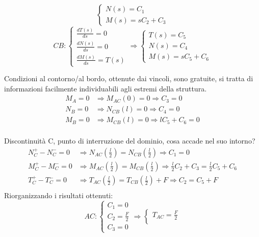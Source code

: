 \documentclass{article}
\begin{document}
\begin{adjustwidth}{2in}{}
\[\begin{cases}
		N(s) = C_1 \\
		
		M(s) =  sC_2 + C_3
	\end{cases}
	\] \newline
	\[
CB:	\begin{cases}
	\frac{dT(s)}{ds}= 0 \\
		
	\frac{dN(s)}{ds}  = 0 \\
		
	\frac{dM(s)}{ds} = T(s) 
	\end{cases} \Rightarrow \begin{cases}
	T(s) = C_5 \\
		
	N(s) = C_4 \\
		
	M(s) =  sC_5 + C_6
	\end{cases}
	\]
	
	Condizioni al contorno/al bordo, ottenute dai vincoli, sono gratuite, si tratta di informazioni facilmente individuabili agli estremi della struttura. \newline
	\[
	\begin{split}
		M_A= 0 & \Rightarrow M_{AC} (0)= 0 \Rightarrow C_3 = 0 \\
		N_B= 0 & \Rightarrow N_{CB} (l)= 0 \Rightarrow C_4 = 0 \\
		M_B= 0 & \Rightarrow M_{CB} (l)= 0 \Rightarrow lC_5 + C_6 = 0 \\
	\end{split} \]

	Discontinuità C, punto di interruzione del dominio, cosa accade nel suo intorno?
	\[
 	\begin{split}
		N^+_C - N^-_C = 0 & \Rightarrow N_{AC} \left( \frac{l}{2}\right)  = N_{CB} \left( \frac{l}{2}\right)  \Rightarrow  C_1 = 0 \\
		M^+_C - M^-_C = 0 & \Rightarrow M_{AC} \left( \frac{l}{2}\right)  = M_{CB} \left( \frac{l}{2}\right)  \Rightarrow  \frac{l}{2}C_2 + C_3 = \frac{l}{2}C_5 + C_6 \\
		T^+_C - T^-_C = 0 & \Rightarrow T_{AC} \left( \frac{l}{2}\right)  = T_{CB} \left( \frac{l}{2}\right)  + F \Rightarrow  C_2 = C_5 + F \\
	\end{split}
	\]
	Riorganizzando i risultati ottenuti:
	\[
AC: 	\begin{cases}
		C_1 = 0 \\
		C_2 = \frac{F}{2} \\
		C_3 = 0
	\end{cases} \Rightarrow \begin{cases}
	T_{AC} = \frac{F}{2} \\
	

\end{cases}\]
\end{adjustwidth}
\end{document}
